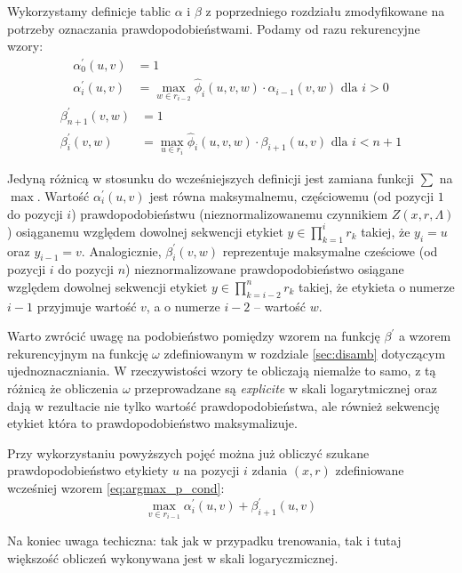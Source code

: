 \documentclass[a4paper,10]{article}
\begin{document}
Wykorzystamy definicje tablic $\alpha$ i $\beta$ z poprzedniego rozdziału
zmodyfikowane na potrzeby oznaczania prawdopodobieństwami.
Podamy od razu rekurencyjne wzory:
\begin{align}
\alpha^\prime_0(u, v) &= 1 \\
\alpha^\prime_i(u, v) &= \max_{w \in r_{i-2}}
    \hat\phi_i(u, v, w) \cdot \alpha_{i-1}(v, w) \mbox{ dla } i > 0
\end{align}
\begin{align}
\beta^\prime_{n+1}(v, w) &= 1 \\
\beta^\prime_i(v, w) &= \max_{u \in r_i}
    \hat\phi_i(u, v, w) \cdot \beta_{i+1}(u, v) \mbox{ dla } i < n + 1
\end{align}

Jedyną różnicą w stosunku do wcześniejszych definicji jest zamiana
funkcji $\sum$ na $\max$.
Wartość $\alpha^\prime_i(u, v)$ jest równa maksymalnemu, częściowemu
(od pozycji $1$ do pozycji $i$) prawdopodobieństwu (nieznormalizowanemu
czynnikiem $Z(x, r, \Lambda)$) osiąganemu względem dowolnej sekwencji
etykiet $y \in \prod_{k=1}^i r_k$ takiej, że $y_i = u$ oraz
$y_{i-1} = v$.
Analogicznie, $\beta^\prime_i(v, w)$ reprezentuje maksymalne cześciowe 
(od pozycji $i$ do pozycji $n$) nieznormalizowane prawdopodobieństwo
osiągane względem dowolnej sekwencji
etykiet $y \in \prod_{k=i-2}^n r_k$ takiej, że etykieta o numerze
$i-1$ przyjmuje wartość $v$, a o numerze $i-2$ -- wartość $w$.

Warto zwrócić uwagę na podobieństwo pomiędzy wzorem na funkcję $\beta^\prime$
a wzorem rekurencyjnym na funkcję $\omega$ zdefiniowanym w rozdziale \ref{sec:disamb}
dotyczącym ujednoznaczniania. W rzeczywistości wzory te obliczają
niemalże to samo, z tą różnicą że obliczenia $\omega$ przeprowadzane
są \emph{explicite} w skali logarytmicznej oraz dają w rezultacie
nie tylko wartość prawdopodobieństwa, ale również sekwencję etykiet
która to prawdopodobieństwo maksymalizuje.

Przy wykorzystaniu powyższych pojęć można już obliczyć
szukane prawdopodobieństwo etykiety $u$ na pozycji $i$
zdania $(x, r)$ zdefiniowane wcześniej wzorem \ref{eq:argmax_p_cond}:
\begin{equation}
\max_{v \in r_{i-1}} \alpha^\prime_i(u, v) + \beta^\prime_{i + 1}(u, v)
\end{equation}

Na koniec uwaga techiczna: tak jak w przypadku trenowania, tak i
tutaj większość obliczeń wykonywana jest w skali logaryczmicznej.
\end{document}
